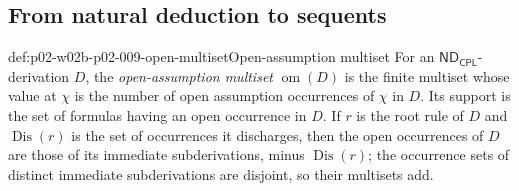 \subsection{From natural deduction to sequents}

\begin{hbdefinition}{def:p02-w02b-p02-009-open-multiset}{Open-assumption multiset}
For an \(\mathsf{ND}_{\mathsf{CPL}}\)-derivation \(D\), the
\emph{open-assumption multiset} \(\operatorname{om}(D)\) is the finite
multiset whose value at \(\chi\) is the number of open assumption
occurrences of \(\chi\) in \(D\).  Its support is the set of formulas having
an open occurrence in \(D\).  If \(r\) is the root rule of \(D\) and
\(\operatorname{Dis}(r)\) is the set of occurrences it discharges, then the
open occurrences of \(D\) are those of its immediate subderivations, minus
\(\operatorname{Dis}(r)\); the occurrence sets of distinct immediate
subderivations are disjoint, so their multisets add.
\end{hbdefinition}

